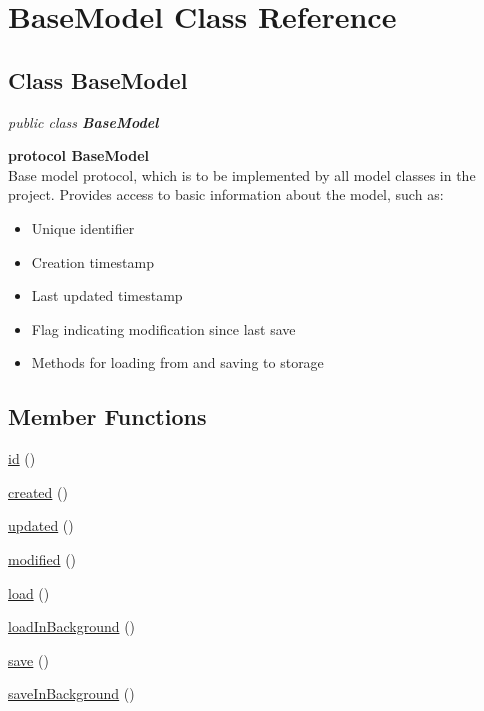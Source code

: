 
\hypertarget{class_BaseModel.iOS}{\section{BaseModel Class Reference}
\label{class_BaseModel.iOS}
}

\subsection*{Class BaseModel}

\textit{public class \textbf{ BaseModel}}

\tab \textbf{protocol BaseModel}\\

Base model protocol, which is to be implemented by all model classes in the project. Provides access to basic information about the model, such as:\\

\begin{itemize}
\item Unique identifier
\item Creation timestamp
\item Last updated timestamp
\item Flag indicating modification since last save
\item Methods for loading from and saving to storage
\end{itemize}


\subsection*{Member Functions}
\begin{DoxyCompactItemize}
\item 
\hyperlink{class_BaseModel.iOS.id}{id} ()
\item 
\hyperlink{class_BaseModel.iOS.created}{created} ()
\item 
\hyperlink{class_BaseModel.iOS.updated}{updated} ()
\item 
\hyperlink{class_BaseModel.iOS.modified}{modified} ()
\item 
\hyperlink{class_BaseModel.iOS.load}{load} ()
\item 
\hyperlink{class_BaseModel.iOS.loadInBackground}{loadInBackground} ()
\item 
\hyperlink{class_BaseModel.iOS.save}{save} ()
\item 
\hyperlink{class_BaseModel.iOS.saveInBackground}{saveInBackground} ()

\end{DoxyCompactItemize}




